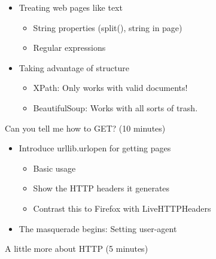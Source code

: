 \documentclass[10pt,a4paper,english]{article}
\begin{document}
\begin{itemize}
\item {} 
Treating web pages like text
\begin{itemize}
\item {} 
String properties (split(), string in page)

\item {} 
Regular expressions

\end{itemize}

\item {} 
Taking advantage of structure
\begin{itemize}
\item {} 
XPath: Only works with valid documents!

\item {} 
BeautifulSoup: Works with all sorts of trash.

\end{itemize}

\end{itemize}
\setcounter{listcnt0}{0}
\begin{list}{.}
{
\addtocounter{listcnt0}{3}
\setlength{\rightmargin}{\leftmargin}
}
\item {} 
Can you tell me how to GET? (10 minutes)

\end{list}
\begin{itemize}
\item {} 
Introduce urllib.urlopen for getting pages
\begin{itemize}
\item {} 
Basic usage

\item {} 
Show the HTTP headers it generates

\item {} 
Contrast this to Firefox with LiveHTTPHeaders

\end{itemize}

\item {} 
The masquerade begins: Setting user-agent

\end{itemize}
\setcounter{listcnt0}{0}
\begin{list}{.}
{
\addtocounter{listcnt0}{4}
\setlength{\rightmargin}{\leftmargin}
}
\item {} 
A little more about HTTP (5 minutes)

\end{list}
\end{document}
